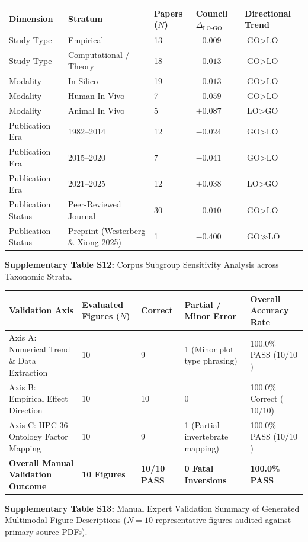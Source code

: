 \documentclass[12pt]{article}
\begin{document}
\begin{longtable}[]{@{}lllll@{}}
\toprule
\textbf{Dimension} & \textbf{Stratum} & \textbf{Papers ($N$)} & \textbf{Council $\Delta_{\text{LO-GO}}$} & \textbf{Directional Trend} \\
\midrule
\endhead
\bottomrule
\endlastfoot
Study Type & Empirical & 13 & $-0.009$ & $\text{GO} > \text{LO}$ \\
Study Type & Computational / Theory & 18 & $-0.013$ & $\text{GO} > \text{LO}$ \\
Modality & In Silico & 19 & $-0.013$ & $\text{GO} > \text{LO}$ \\
Modality & Human In Vivo & 7 & $-0.059$ & $\text{GO} > \text{LO}$ \\
Modality & Animal In Vivo & 5 & $+0.087$ & $\text{LO} > \text{GO}$ \\
Publication Era & 1982--2014 & 12 & $-0.024$ & $\text{GO} > \text{LO}$ \\
Publication Era & 2015--2020 & 7 & $-0.041$ & $\text{GO} > \text{LO}$ \\
Publication Era & 2021--2025 & 12 & $+0.038$ & $\text{LO} > \text{GO}$ \\
Publication Status & Peer-Reviewed Journal & 30 & $-0.010$ & $\text{GO} > \text{LO}$ \\
Publication Status & Preprint (Westerberg \& Xiong 2025) & 1 & $-0.400$ & $\text{GO} \gg \text{LO}$ \\
\end{longtable}

\textbf{Supplementary Table S12:} Corpus Subgroup Sensitivity Analysis across Taxonomic Strata.

\begin{longtable}[]{@{}lllll@{}}
\toprule
\textbf{Validation Axis} & \textbf{Evaluated Figures ($N$)} & \textbf{Correct} & \textbf{Partial / Minor Error} & \textbf{Overall Accuracy Rate} \\
\midrule
\endhead
\bottomrule
\endlastfoot
Axis A: Numerical Trend \& Data Extraction & 10 & 9 & 1 (Minor plot type phrasing) & 100.0\% PASS ($10/10$) \\
Axis B: Empirical Effect Direction & 10 & 10 & 0 & 100.0\% Correct ($10/10$) \\
Axis C: HPC-36 Ontology Factor Mapping & 10 & 9 & 1 (Partial invertebrate mapping) & 100.0\% PASS ($10/10$) \\
\midrule
\textbf{Overall Manual Validation Outcome} & \textbf{10 Figures} & \textbf{10/10 PASS} & \textbf{0 Fatal Inversions} & \textbf{100.0\% PASS} \\
\end{longtable}

\textbf{Supplementary Table S13:} Manual Expert Validation Summary of Generated Multimodal Figure Descriptions ($N=10$ representative figures audited against primary source PDFs).
\end{document}
